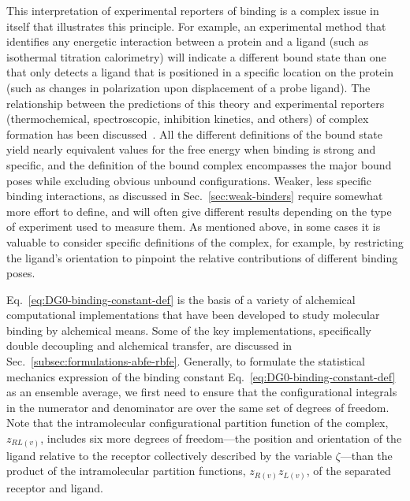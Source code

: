 \documentclass[9pt,bestpractices]{livecoms}
\begin{document}
This interpretation of experimental reporters of binding is a complex issue in itself that illustrates this principle. For example, an experimental method that identifies any energetic interaction between a protein and a ligand (such as isothermal titration calorimetry) will indicate a different bound state than one that only detects a ligand that is positioned in a specific location on the protein (such as changes in polarization upon displacement of a probe ligand). The relationship between the predictions of this theory and experimental reporters (thermochemical, spectroscopic, inhibition kinetics, and others) of complex formation has been discussed~\cite{gilson1997statisticalthermodynamic,mihailescu2004theory,gallicchio2011recent,simonson2016physical,gallicchio2021comppeptsci}. All the different definitions of the bound state yield nearly equivalent values for the free energy when binding is strong and specific, and the definition of the bound complex encompasses the major bound poses while excluding obvious unbound configurations. Weaker, less specific binding interactions, as discussed in Sec.~\ref{sec:weak-binders} require somewhat more effort to define, and will often give different results depending on the type of experiment used to measure them.  As mentioned above, in some cases it is valuable to consider specific definitions of the complex, for example, by restricting the ligand's orientation to pinpoint the relative contributions of different binding poses.

Eq.~\ref{eq:DG0-binding-constant-def} is the basis of a variety of alchemical computational implementations that have been developed to study molecular binding by alchemical means. Some of the key implementations, specifically double decoupling and alchemical transfer, are discussed in Sec.~\ref{subsec:formulations-abfe-rbfe}. Generally, to formulate the statistical mechanics expression of the binding constant Eq.~\ref{eq:DG0-binding-constant-def} as an ensemble average, we first need to ensure that the configurational integrals in the numerator and denominator are over the same set of degrees of freedom. Note that the intramolecular configurational partition function of the complex, $z_{RL(v)}$, includes six more degrees of freedom---the position and orientation of the ligand relative to the receptor collectively described by the variable $\zeta$---than the product of the intramolecular partition functions, $z_{R(v)} z_{L(v)}$, of the separated receptor and ligand.
\end{document}
